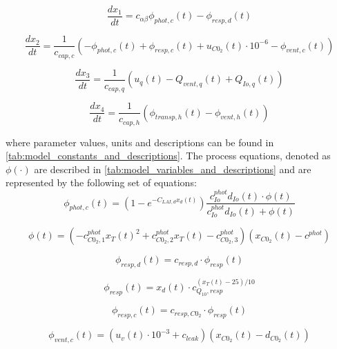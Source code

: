 \begin{equation}
	\frac{dx_1}{dt} = c_{\alpha \beta} \phi_{phot,c}(t) - \phi_{resp,d}(t)
\end{equation}

\begin{equation}
	\frac{dx_{2}}{dt} = \frac{1}{c_{cap,c}}(-\phi_{phot,c}(t) + \phi_{resp,c}(t) + u_{C0_2}(t) \cdot 10^{-6} - \phi_{vent,c}(t))
\end{equation}

\begin{equation}
	\frac{dx_{3}}{dt} = \frac{1}{c_{cap,q}}(u_{q}(t) - Q_{vent,q}(t) + Q_{Io,q}(t))
\end{equation}

\begin{equation}
	\frac{dx_{4}}{dt} = \frac{1}{c_{cap,h}}(\phi_{transp,h}(t) - \phi_{vent,h}(t))
\end{equation}

where parameter values, units and descriptions can be found in \autoref{tab:model_constants_and_descriptions}. The process equations, denoted as $\phi(\cdot)$ are described in \autoref{tab:model_variables_and_descriptions} and are represented by the following set of equations:
\begin{equation}
	\phi_{phot,c}(t) = (1 - e^{-C_{LAI,d} x_d(t)}) \frac{c_{Io}^{phot} d_{Io}(t) \cdot \phi(t)}{c_{Io}^{phot} d_{Io}(t) +\phi(t)}
	\label{eq: canopy photosynthesis rate}
\end{equation}

\begin{equation}
	\phi (t) = ( -c_{C0_2,1}^{phot} x_T(t)^2 +  c_{C0_2,2}^{phot} x_T(t) - c_{C0_2,3}^{phot} )( x_{C0_2}(t) - c^{phot})
	\label{eq: model phi}
\end{equation}

\begin{equation}
	\phi_{resp,d}(t) = c_{resp,d} \cdot \phi_{resp}(t)
	\label{eq:maintenance respiration rate}
\end{equation}

\begin{equation}
	\phi_{resp}(t) = x_d(t) \cdot c_{Q_{10},resp}^{(x_T(t)-25)/10}
	\label{ respiration maintenance}
\end{equation}

\begin{equation}
	\phi_{resp,c}(t) = c_{resp,C0_2} \cdot \phi_{resp}(t)
	\label{ co2 respiration rate}
\end{equation}

\begin{equation}
	\phi_{vent,c}(t) = (u_v(t) \cdot 10^{-3} + c_{leak})(x_{C0_2}(t) - d_{C0_2}(t))
	\label{eq:co2 exchange}
\end{equation}

